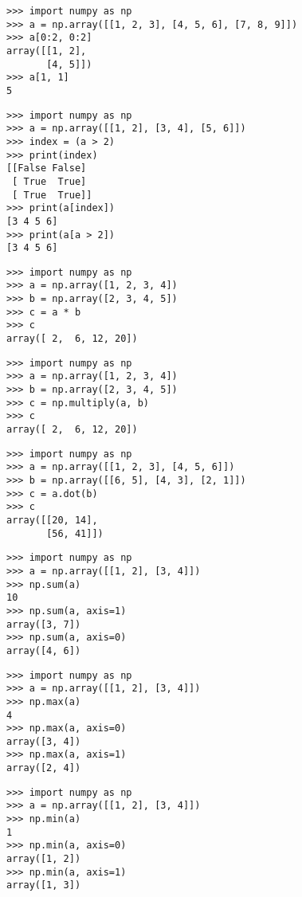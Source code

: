 \begin{verbatim}
>>> import numpy as np
>>> a = np.array([[1, 2, 3], [4, 5, 6], [7, 8, 9]])
>>> a[0:2, 0:2]
array([[1, 2],
       [4, 5]])
>>> a[1, 1]
5
\end{verbatim}


\begin{verbatim}
>>> import numpy as np
>>> a = np.array([[1, 2], [3, 4], [5, 6]])
>>> index = (a > 2)
>>> print(index)
[[False False]
 [ True  True]
 [ True  True]]
>>> print(a[index])
[3 4 5 6]
>>> print(a[a > 2])
[3 4 5 6]
\end{verbatim}


\begin{verbatim}
>>> import numpy as np
>>> a = np.array([1, 2, 3, 4])
>>> b = np.array([2, 3, 4, 5])
>>> c = a * b
>>> c
array([ 2,  6, 12, 20])
\end{verbatim}

\begin{verbatim}
>>> import numpy as np
>>> a = np.array([1, 2, 3, 4])
>>> b = np.array([2, 3, 4, 5])
>>> c = np.multiply(a, b)
>>> c
array([ 2,  6, 12, 20])
\end{verbatim}

\begin{verbatim}
>>> import numpy as np
>>> a = np.array([[1, 2, 3], [4, 5, 6]])
>>> b = np.array([[6, 5], [4, 3], [2, 1]])
>>> c = a.dot(b)
>>> c
array([[20, 14],
       [56, 41]])
\end{verbatim}

\begin{verbatim}
>>> import numpy as np
>>> a = np.array([[1, 2], [3, 4]])
>>> np.sum(a)
10
>>> np.sum(a, axis=1)
array([3, 7])
>>> np.sum(a, axis=0)
array([4, 6])
\end{verbatim}

\begin{verbatim}
>>> import numpy as np
>>> a = np.array([[1, 2], [3, 4]])
>>> np.max(a)
4
>>> np.max(a, axis=0)
array([3, 4])
>>> np.max(a, axis=1)
array([2, 4])
\end{verbatim}

\begin{verbatim}
>>> import numpy as np
>>> a = np.array([[1, 2], [3, 4]])
>>> np.min(a)
1
>>> np.min(a, axis=0)
array([1, 2])
>>> np.min(a, axis=1)
array([1, 3])
\end{verbatim}

